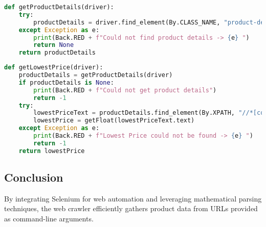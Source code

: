 
\begin{lstlisting}[language=Python, caption={Function to Retrieve Product Details}]
def getProductDetails(driver):
    try:
        productDetails = driver.find_element(By.CLASS_NAME, "product-details")
    except Exception as e:
        print(Back.RED + f"Could not find product details -> {e} ")
        return None
    return productDetails
\end{lstlisting}


\begin{lstlisting}[language=Python, caption={Function to Extract Lowest Price}]
def getLowestPrice(driver):
    productDetails = getProductDetails(driver)
    if productDetails is None:
        print(Back.RED + f"Could not get product details")
        return -1
    try:
        lowestPriceText = productDetails.find_element(By.XPATH, "//*[contains(@itemprop, 'lowPrice')]")
        lowestPrice = getFloat(lowestPriceText.text)
    except Exception as e:
        print(Back.RED + f"Lowest Price could not be found -> {e} ")
        return -1
    return lowestPrice
\end{lstlisting}





\subsection*{Conclusion}

By integrating Selenium for web automation and leveraging mathematical parsing techniques, the web crawler efficiently gathers product data from URLs provided as command-line arguments.





